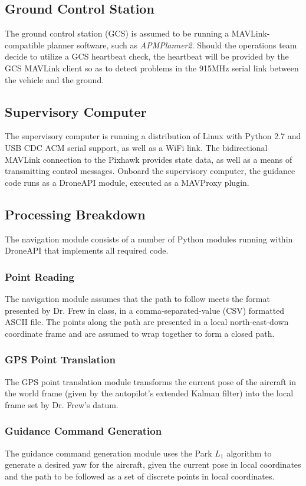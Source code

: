\documentclass{aiaa}
\begin{document}
\subsection{Ground Control Station}
The ground control station (GCS) is assumed to be running a MAVLink-compatible planner software, such as \textit{APMPlanner2}. Should the operations team decide to utilize a GCS heartbeat check, the heartbeat will be provided by the GCS MAVLink client so as to detect problems in the 915MHz serial link between the vehicle and the ground. 
\subsection{Supervisory Computer}
The supervisory computer is running a distribution of Linux with Python 2.7 and USB CDC ACM serial support, as well as a WiFi link. The bidirectional MAVLink connection to the Pixhawk provides state data, as well as a means of transmitting control messages. Onboard the supervisory computer, the guidance code runs as a DroneAPI module, executed as a MAVProxy plugin.

\subsection{Processing Breakdown}
The navigation module consists of a number of Python modules running within DroneAPI that implements all required code. 
\subsubsection{Point Reading}
The navigation module assumes that the path to follow meets the format presented by Dr. Frew in class, in a comma-separated-value (CSV) formatted ASCII file. The points along the path are presented in a local north-east-down coordinate frame and are assumed to wrap together to form a closed path. 
\subsubsection{GPS Point Translation}
The GPS point translation module transforms the current pose of the aircraft in the world frame (given by the autopilot's extended Kalman filter) into the local frame set by Dr. Frew's datum.
  
\subsubsection{Guidance Command Generation}
The guidance command generation module uses the Park $L_1$ algorithm to generate a desired yaw for the aircraft, given the current pose in local coordinates and the path to be followed as a set of discrete points in local coordinates.
\end{document}
